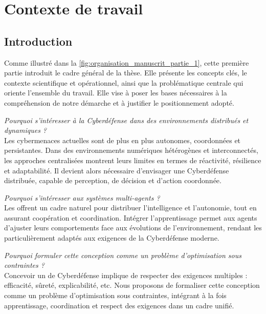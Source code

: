 \cleardoublepage
{}
\part{Contexte de travail}
\label{part:contexte}

\chapter*{Introduction}

Comme illustré dans la \autoref{fig:organisation_manuscrit_partie_1}, cette première partie introduit le cadre général de la thèse. Elle présente les concepts clés, le contexte scientifique et opérationnel, ainsi que la problématique centrale qui oriente l'ensemble du travail. Elle vise à poser les bases nécessaires à la compréhension de notre démarche et à justifier le positionnement adopté.

\vspace{1em}

\noindent \textit{Pourquoi s'intéresser à la Cyberdéfense dans des environnements distribués et dynamiques ?}\\
Les cybermenaces actuelles sont de plus en plus autonomes, coordonnées et persistantes. Dans des environnements numériques hétérogènes et interconnectés, les approches centralisées montrent leurs limites en termes de réactivité, résilience et adaptabilité. Il devient alors nécessaire d'envisager une Cyberdéfense distribuée, capable de perception, de décision et d'action coordonnée.

\vspace{0.5em}

\noindent \textit{Pourquoi s'intéresser aux systèmes multi-agents ?}\\
Les  offrent un cadre naturel pour distribuer l'intelligence et l'autonomie, tout en assurant coopération et coordination. Intégrer l'apprentissage permet aux agents d'ajuster leurs comportements face aux évolutions de l'environnement, rendant les  particulièrement adaptés aux exigences de la Cyberdéfense moderne.

\vspace{0.5em}

\noindent \textit{Pourquoi formuler cette conception comme un problème d'optimisation sous contraintes ?}\\
Concevoir un  de Cyberdéfense implique de respecter des exigences multiples : efficacité, sûreté, explicabilité, etc. Nous proposons de formaliser cette conception comme un problème d'optimisation sous contraintes, intégrant à la fois apprentissage, coordination et respect des exigences dans un cadre unifié.

